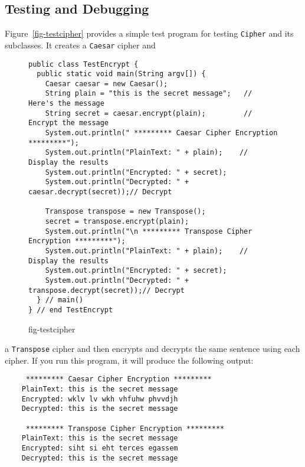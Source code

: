 \subsection{Testing and Debugging}
\noindent Figure~\ref{fig-testcipher} provides a simple test program for testing
{\tt Cipher} and its subclasses.  It creates a {\tt Caesar} cipher and
\begin{figure}[tb]
\jjjprogstart
\begin{jjjlisting}[35pc]
\begin{lstlisting}
public class TestEncrypt {
  public static void main(String argv[]) {
    Caesar caesar = new Caesar();
    String plain = "this is the secret message";   // Here's the message
    String secret = caesar.encrypt(plain);         // Encrypt the message
    System.out.println(" ********* Caesar Cipher Encryption *********");
    System.out.println("PlainText: " + plain);    // Display the results
    System.out.println("Encrypted: " + secret);
    System.out.println("Decrypted: " + caesar.decrypt(secret));// Decrypt

    Transpose transpose = new Transpose();
    secret = transpose.encrypt(plain);
    System.out.println("\n ********* Transpose Cipher Encryption *********");
    System.out.println("PlainText: " + plain);    // Display the results
    System.out.println("Encrypted: " + secret);
    System.out.println("Decrypted: " + transpose.decrypt(secret));// Decrypt
  } // main()
} // end TestEncrypt

\end{lstlisting}
\end{jjjlisting}
{fig-testcipher}
\end{figure}
a {\tt Transpose} cipher and then encrypts and decrypts the same
sentence using each cipher.  If you run this program, it will produce
the following output:

\begin{jjjlisting}
\begin{lstlisting}
     ********* Caesar Cipher Encryption *********
    PlainText: this is the secret message
    Encrypted: wklv lv wkh vhfuhw phvvdjh
    Decrypted: this is the secret message

     ********* Transpose Cipher Encryption *********
    PlainText: this is the secret message
    Encrypted: siht si eht terces egassem
    Decrypted: this is the secret message
\end{lstlisting}
\end{jjjlisting}

